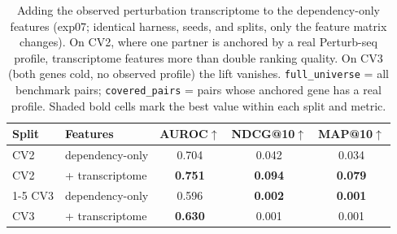 \begin{table}[!htbp]
  \centering
  \caption{Adding the observed perturbation transcriptome to the dependency-only features (exp07; identical harness, seeds, and splits, only the feature matrix changes). On CV2, where one partner is anchored by a real Perturb-seq profile, transcriptome features more than double ranking quality. On CV3 (both genes cold, no observed profile) the lift vanishes. \texttt{full\_universe} = all benchmark pairs; \texttt{covered\_pairs} = pairs whose anchored gene has a real profile. Shaded bold cells mark the best value within each split and metric.}
  \label{tab:transcriptome}
  \begin{tabular}{llccc}
    \toprule
    Split & Features & AUROC$\uparrow$ & NDCG@10$\uparrow$ & MAP@10$\uparrow$ \\
    \midrule
    CV2 & dependency-only & 0.704 & 0.042 & 0.034 \\
    CV2 & + transcriptome & \cellcolor{hl}\textbf{0.751} & \cellcolor{hl}\textbf{0.094} & \cellcolor{hl}\textbf{0.079} \\
    \cmidrule(lr){1-5}
    CV3 & dependency-only & 0.596 & \cellcolor{hl}\textbf{0.002} & \cellcolor{hl}\textbf{0.001} \\
    CV3 & + transcriptome & \cellcolor{hl}\textbf{0.630} & 0.001 & 0.001 \\
    \bottomrule
  \end{tabular}
\end{table}
